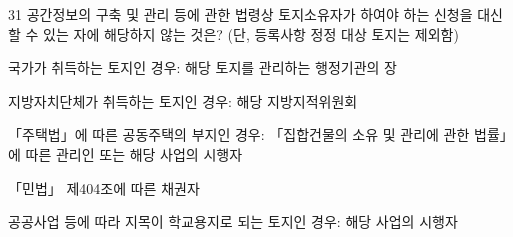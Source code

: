 \begin{question}{31}
공간정보의 구축 및 관리 등에 관한 법령상 토지소유자가 하여야 하는 신청을 대신할 수 있는 자에 해당하지 않는 것은? (단, 등록사항 정정 대상 토지는 제외함)
\begin{choices}
  \item 국가가 취득하는 토지인 경우: 해당 토지를 관리하는 행정기관의 장
  \item 지방자치단체가 취득하는 토지인 경우: 해당 지방지적위원회
  \item 「주택법」에 따른 공동주택의 부지인 경우: 「집합건물의 소유 및 관리에 관한 법률」에 따른 관리인 또는 해당 사업의 시행자
  \item 「민법」 제404조에 따른 채권자
  \item 공공사업 등에 따라 지목이 학교용지로 되는 토지인 경우: 해당 사업의 시행자
\end{choices}
\end{question}
